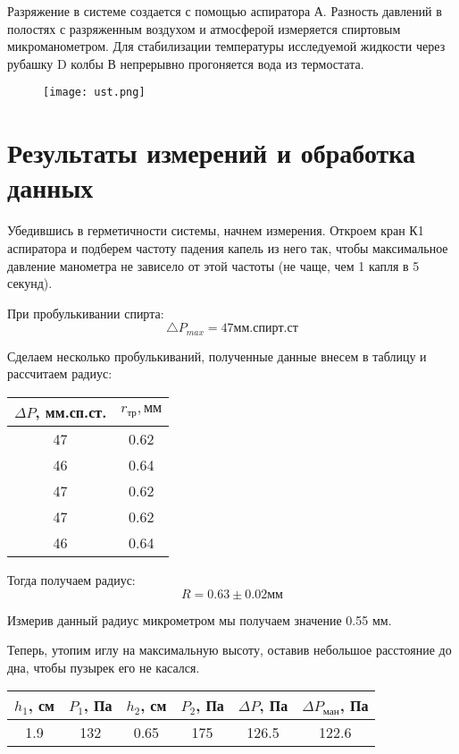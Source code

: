\documentclass[a4paper, 12pt]{article}
\begin{document}
    Разряжение в системе создается с помощью аспиратора А. Разность давлений в полостях с разряженным воздухом и атмосферой измеряется спиртовым микроманометром.
    Для стабилизации температуры исследуемой жидкости через рубашку D колбы В непрерывно прогоняется вода из термостата.

    \begin{figure}[h]
        \centering
        \texttt{[image: ust.png]}
    \end{figure}
    
\section {Результаты измерений и обработка данных} 

    Убедившись в герметичности системы, начнем измерения. Откроем кран К1 аспиратора и подберем частоту падения капель из него так, чтобы максимальное давление манометра не зависело от этой частоты (не чаще, чем 1 капля в 5 секунд).

    При пробулькивании спирта:
    \[
        \triangle P_{max} = 47 мм.спирт.ст
    \]

    Сделаем несколько пробулькиваний, полученные данные внесем в таблицу и рассчитаем радиус:

    \begin{table}[h]
        \centering
        \begin{tabular}{|c|c|}
            \hline
            $\Delta P$, мм.сп.ст. & $r_{тр}, мм$\\    
            \hline        
            47 & 0.62 \\
            46 & 0.64 \\
            47 & 0.62 \\
            47 & 0.62 \\
            46 & 0.64 \\
            \hline   
        \end{tabular}
    \end{table}

    Тогда получаем радиус:
    \[
        R = 0.63 \pm 0.02 мм
    \]

    Измерив данный радиус микрометром мы получаем значение 0.55 мм. 

    Теперь, утопим иглу на максимальную высоту, оставив небольшое расстояние до дна, чтобы пузырек его не касался.  

    \begin{table}[h]
        \begin{center}
            \begin{tabular}{|c|c|c|c|c|c|}
                \hline
                $h_1$, см & $P_1$, Па & $h_2$, см & $P_2$, Па & $\Delta P$, Па & $\Delta P_{ман}$, Па\\
                \hline
                1.9 & 132 & 0.65 & 175 & 126.5 & 122.6\\
                \hline
            \end{tabular}
        \end{center}
    \end{table}
\end{document}
